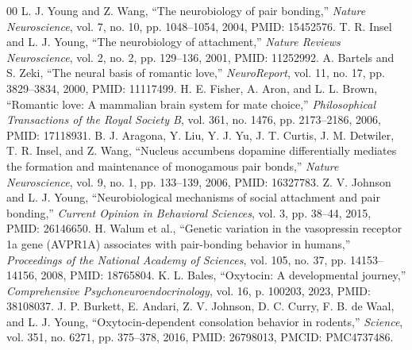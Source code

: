 \documentclass[conference]{IEEEtran}
\begin{document}
\balance
\begin{thebibliography}{00}
 L. J. Young and Z. Wang, ``The neurobiology of pair bonding,'' \emph{Nature Neuroscience}, vol. 7, no. 10, pp. 1048--1054, 2004, PMID: 15452576.
 T. R. Insel and L. J. Young, ``The neurobiology of attachment,'' \emph{Nature Reviews Neuroscience}, vol. 2, no. 2, pp. 129--136, 2001, PMID: 11252992.
 A. Bartels and S. Zeki, ``The neural basis of romantic love,'' \emph{NeuroReport}, vol. 11, no. 17, pp. 3829--3834, 2000, PMID: 11117499.
 H. E. Fisher, A. Aron, and L. L. Brown, ``Romantic love: A mammalian brain system for mate choice,'' \emph{Philosophical Transactions of the Royal Society B}, vol. 361, no. 1476, pp. 2173--2186, 2006, PMID: 17118931.
 B. J. Aragona, Y. Liu, Y. J. Yu, J. T. Curtis, J. M. Detwiler, T. R. Insel, and Z. Wang, ``Nucleus accumbens dopamine differentially mediates the formation and maintenance of monogamous pair bonds,'' \emph{Nature Neuroscience}, vol. 9, no. 1, pp. 133--139, 2006, PMID: 16327783.
 Z. V. Johnson and L. J. Young, ``Neurobiological mechanisms of social attachment and pair bonding,'' \emph{Current Opinion in Behavioral Sciences}, vol. 3, pp. 38--44, 2015, PMID: 26146650.
 H. Walum et al., ``Genetic variation in the vasopressin receptor 1a gene (AVPR1A) associates with pair-bonding behavior in humans,'' \emph{Proceedings of the National Academy of Sciences}, vol. 105, no. 37, pp. 14153--14156, 2008, PMID: 18765804.
 K. L. Bales, ``Oxytocin: A developmental journey,'' \emph{Comprehensive Psychoneuroendocrinology}, vol. 16, p. 100203, 2023, PMID: 38108037.
 J. P. Burkett, E. Andari, Z. V. Johnson, D. C. Curry, F. B. de Waal, and L. J. Young, ``Oxytocin-dependent consolation behavior in rodents,'' \emph{Science}, vol. 351, no. 6271, pp. 375--378, 2016, PMID: 26798013, PMCID: PMC4737486.
\end{thebibliography}
\end{document}
